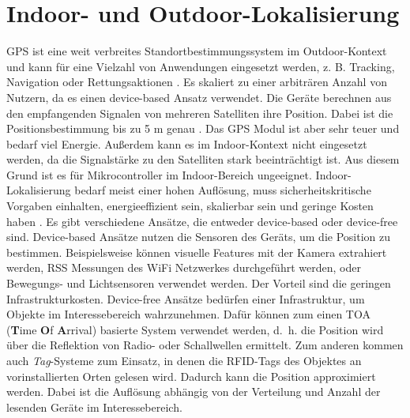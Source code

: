 \section{Indoor- und Outdoor-Lokalisierung}
GPS ist eine weit verbreites Standortbestimmungssystem im Outdoor-Kontext  und kann für eine Vielzahl von Anwendungen eingesetzt werden,
z. B. Tracking, Navigation oder Rettungsaktionen \cite{kaplan2005understanding}.
Es skaliert zu einer arbiträren Anzahl von Nutzern, da es einen device-based Ansatz verwendet.
Die Geräte berechnen aus den empfangenden Signalen von mehreren Satelliten ihre Position.
Dabei ist die Positionsbestimmung bis zu 5 m genau \cite{sadowski2018rssi}.
Das GPS Modul ist aber sehr teuer und bedarf viel Energie.
Außerdem kann es im Indoor-Kontext nicht eingesetzt werden, da die Signalstärke zu den Satelliten stark beeinträchtigt ist.
Aus diesem Grund ist es für Mikrocontroller im Indoor-Bereich ungeeignet.
\newline
\newline
Indoor-Lokalisierung bedarf meist einer hohen Auflösung, muss sicherheitskritische Vorgaben einhalten,
energieeffizient sein, skalierbar sein und geringe Kosten haben \cite{xiao2016survey}.
Es gibt verschiedene Ansätze, die entweder device-based oder device-free sind.
\newline
\newline
Device-based Ansätze nutzen die Sensoren des Geräts, um die Position zu bestimmen.
Beispielsweise können visuelle Features mit der Kamera extrahiert werden,
RSS Messungen des WiFi Netzwerkes durchgeführt werden, oder Bewegungs- und Lichtsensoren verwendet werden.
Der Vorteil sind die geringen Infrastrukturkosten.
\newline
\newline
Device-free Ansätze bedürfen einer Infrastruktur, um Objekte im Interessebereich wahrzunehmen.
Dafür können zum einen TOA (\textbf{T}ime \textbf{O}f \textbf{A}rrival) basierte System verwendet werden, d.~h. die Position wird über
die Reflektion von Radio- oder Schallwellen ermittelt.
Zum anderen kommen auch \textit{Tag}-Systeme zum Einsatz, in denen die RFID-Tags des Objektes an vorinstallierten Orten gelesen wird.
Dadurch kann die Position approximiert werden.
Dabei ist die Auflösung abhängig von der Verteilung und Anzahl der lesenden Geräte im Interessebereich.